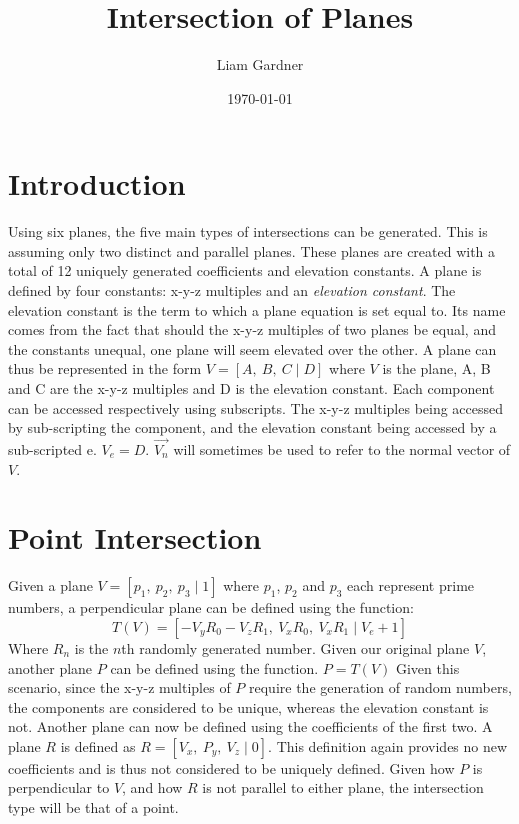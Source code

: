 \documentclass[a4paper, 12pt]{article}
\author{Liam Gardner}
\date{\today}
\title{Intersection of Planes}
\begin{document}
\newcommand{\plane}[4]{\left[#1, \: #2, \: #3\; | \; #4\right]}

\maketitle
\newpage
\tableofcontents
\newpage
\section{Introduction}
Using six planes, the five main types of intersections can be generated. This is assuming only two distinct and parallel planes. These planes are created with a total of 12 uniquely generated coefficients and elevation constants. A plane is defined by four constants: x-y-z multiples and an \textit{elevation constant}. The elevation constant is the term to which a plane equation is set equal to. Its name comes from the fact that should the x-y-z multiples of two planes be equal, and the constants unequal, one plane will seem elevated over the other. A plane can thus be represented in the form $V = \plane{A}{B}{C}{D}$ where $V$ is the plane, A, B and C are the x-y-z multiples and D is the elevation constant. Each component can be accessed respectively using subscripts. The x-y-z multiples being accessed by sub-scripting the component, and the elevation constant being accessed by a sub-scripted e. $V_e = D$. $\vec{V_n}$ will sometimes be used to refer to the normal vector of $V$.
\section{Point Intersection}
Given a plane $V=\plane{p_1}{p_2}{p_3}{1}$ where $p_1$, $p_2$ and $p_3$ each represent prime numbers, a perpendicular plane can be defined using the function:
\begin{equation}
	T(V) = \plane{-V_yR_0 - V_zR_1}{V_xR_0}{V_xR_1}{V_e+1}
\end{equation}
Where $R_n$ is the $n$th randomly generated number. 
Given our original plane $V$, another plane $P$ can be defined using the function. $P=T(V)$ Given this scenario, since the x-y-z multiples of $P$ require the generation of random numbers, the components are considered to be unique, whereas the elevation constant is not. Another plane can now be defined using the coefficients of the first two. A plane $R$ is defined as $R=\plane{V_x}{P_y}{V_z}{0}$. This definition again provides no new coefficients and is thus not considered to be uniquely defined. Given how $P$ is perpendicular to $V$, and how $R$ is not parallel to either plane, the intersection type will be that of a point.
\end{document}
